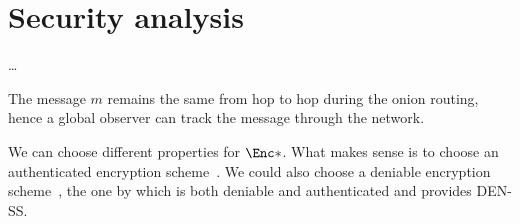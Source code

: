 \section{Security analysis}%
\label{SecurityAnalysis}

\dots

The message \(m\) remains the same from hop to hop during the onion routing, 
hence a global observer can track the message through the network.

We can choose different properties for \(\Enc*\).
What makes sense is to choose an authenticated encryption 
scheme~\cite{AuthEncryption}.
We could also choose a deniable encryption scheme~\cite{DeniableEncryption}, \eg 
the one by \textcite{OTPKX} which is both deniable and authenticated and 
provides \ac{DEN-SS}.
